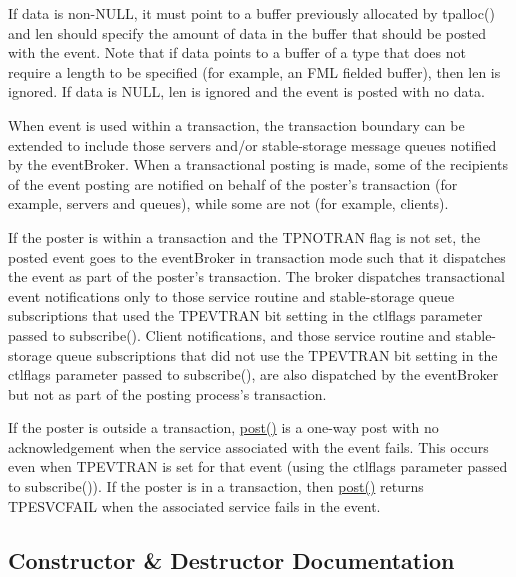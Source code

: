 If data is non-\/\+N\+U\+LL, it must point to a buffer previously allocated by tpalloc() and len should specify the amount of data in the buffer that should be posted with the event. Note that if data points to a buffer of a type that does not require a length to be specified (for example, an F\+ML fielded buffer), then len is ignored. If data is N\+U\+LL, len is ignored and the event is posted with no data.

When event is used within a transaction, the transaction boundary can be extended to include those servers and/or stable-\/storage message queues notified by the event\+Broker. When a transactional posting is made, some of the recipients of the event posting are notified on behalf of the poster’s transaction (for example, servers and queues), while some are not (for example, clients).

If the poster is within a transaction and the T\+P\+N\+O\+T\+R\+AN flag is not set, the posted event goes to the event\+Broker in transaction mode such that it dispatches the event as part of the poster’s transaction. The broker dispatches transactional event notifications only to those service routine and stable-\/storage queue subscriptions that used the T\+P\+E\+V\+T\+R\+AN bit setting in the ctlflags parameter passed to subscribe(). Client notifications, and those service routine and stable-\/storage queue subscriptions that did not use the T\+P\+E\+V\+T\+R\+AN bit setting in the ctlflags parameter passed to subscribe(), are also dispatched by the event\+Broker but not as part of the posting process’s transaction.

If the poster is outside a transaction, \hyperlink{classatmi_1_1event_a0b1f1faae17aa923ce5a4a0d45cfcd07}{post()} is a one-\/way post with no acknowledgement when the service associated with the event fails. This occurs even when T\+P\+E\+V\+T\+R\+AN is set for that event (using the ctlflags parameter passed to subscribe()). If the poster is in a transaction, then \hyperlink{classatmi_1_1event_a0b1f1faae17aa923ce5a4a0d45cfcd07}{post()} returns T\+P\+E\+S\+V\+C\+F\+A\+IL when the associated service fails in the event. 

\subsection{Constructor \& Destructor Documentation}
